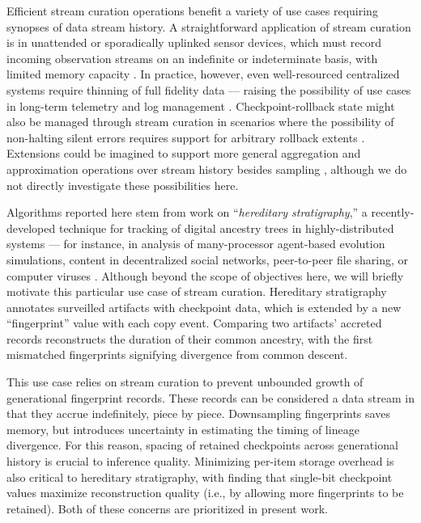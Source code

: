Efficient stream curation operations benefit a variety of use cases requiring synopses of data stream history.
A straightforward application of stream curation is in unattended or sporadically uplinked sensor devices, which must record incoming observation streams on an indefinite or indeterminate basis, with limited memory capacity \citep{jain2022survey}.
In practice, however, even well-resourced centralized systems require thinning of full fidelity data --- raising the possibility of use cases in long-term telemetry and log management \citep{kent2006guide,miebach2002hubble}.
Checkpoint-rollback state might also be managed through stream curation in scenarios where the possibility of non-halting silent errors requires support for arbitrary rollback extents \citep{aupy2013combination}.
Extensions could be imagined to support more general aggregation and approximation operations over stream history besides sampling \citep{schoellhammer2024lightweight}, although we do not directly investigate these possibilities here.


Algorithms reported here stem from work on ``\textit{hereditary stratigraphy},'' a recently-developed technique for tracking of digital ancestry trees in highly-distributed systems --- for instance, in analysis of many-processor agent-based evolution simulations, content in decentralized social networks, peer-to-peer file sharing, or computer viruses \citep{moreno2022hereditary}.
Although beyond the scope of objectives here, we will briefly motivate this particular use case of stream curation.
Hereditary stratigraphy annotates surveilled artifacts with checkpoint data, which is extended by a new ``fingerprint'' value with each copy event.
Comparing two artifacts' accreted records reconstructs the duration of their common ancestry, with the first mismatched fingerprints signifying divergence from common descent.

This use case relies on stream curation to prevent unbounded growth of generational fingerprint records.
These records can be considered a data stream in that they accrue indefinitely, piece by piece.
Downsampling fingerprints saves memory, but introduces uncertainty in estimating the timing of lineage divergence.
For this reason, spacing of retained checkpoints across generational history is crucial to inference quality.
Minimizing per-item storage overhead is also critical to hereditary stratigraphy, with \citet{moreno2024guide} finding that single-bit checkpoint values maximize reconstruction quality (i.e., by allowing more fingerprints to be retained).
Both of these concerns are prioritized in present work.
